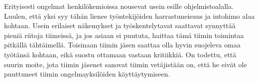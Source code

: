 \documentclass[a4paper]{article}
\begin{document}
Erityisesti ongelmat henkilökemioissa nousevat usein esille ohjelmistoalalla. Luulen, että yksi syy tähän lienee työntekijöiden harrastuneisuus ja intohimo alaa kohtaan. Usein erilaiset näkemykset ja työskentelytavat saattavat synnyttää pieniä riitoja tiimeissä, ja jos asiaan ei puututa, haittaa tämä tiimin toimintaa pitkällä tähtäimellä. Toisinaan tiimin jäsen saattaa olla hyvin suojeleva omaa työtänsä kohtaan, eikä suostu ottamaan vastaan kritiikkiä. On todettu, että suurin moite, jota tiimin jäsenet sanovat tiimin vetäjistään on, että he eivät ole puuttuneet tiimin ongelmayksilöiden käyttäytymiseen.



% 





\end{document}
